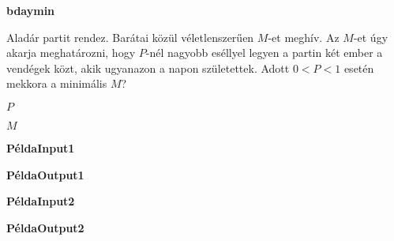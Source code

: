 



\centerline {\bf bdaymin}
\vspace{0.5cm}
\pn
Aladár partit rendez. Barátai közül véletlenszerűen 
$M$-et meghív. Az $M$-et úgy akarja meghatározni, 
hogy $P$-nél nagyobb 
eséllyel legyen a partin két ember a vendégek közt, 
akik ugyanazon a napon születettek.
Adott $0<P<1$ esetén mekkora a minimális $M$?

\vspace{0.5cm}
\pn $P$

\vspace{0.5cm}
\pn $M$

\vspace{1cm}
\noindent
{\bf PéldaInput1}


\noindent
{\bf PéldaOutput1}


\noindent
{\bf PéldaInput2}


\noindent
{\bf PéldaOutput2}




